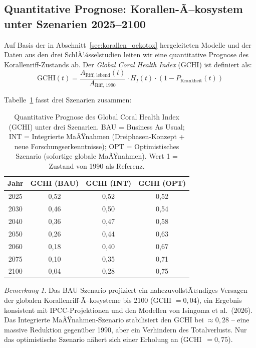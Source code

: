 ﻿\documentclass[12pt,a4paper]{article}
\theoremstyle{definition}
\theoremstyle{remark}
\newtheorem{bemerkung}{Bemerkung}[section]
\begin{document}
\subsection{Quantitative Prognose: Korallen-Ã–kosystem unter Szenarien 2025--2100}
\label{subsec:korallen_prognose}

Auf Basis der in Abschnitt~\ref{sec:korallen_oekotox} hergeleiteten Modelle und der
Daten aus den drei SchlÃ¼sselstudien leiten wir eine quantitative Prognose des
Korallenriff-Zustands ab. Der \textit{Global Coral Health Index} (GCHI) ist
definiert als:
\begin{equation}
  \text{GCHI}(t) = \frac{A_{\text{Riff, lebend}}(t)}{A_{\text{Riff, 1990}}} \cdot
  H_I(t) \cdot (1 - P_{\text{Krankheit}}(t))
  \label{eq:gchi}
\end{equation}

Tabelle~\ref{tab:korallen_prognose} fasst drei Szenarien zusammen:

\begin{table}[H]
  \centering
  \caption{Quantitative Prognose des Global Coral Health Index (GCHI) unter
           drei Szenarien. BAU = Business As Usual; INT = Integrierte
           MaÃŸnahmen (Dreiphasen-Konzept + neue Forschungserkenntnisse);
           OPT = Optimistisches Szenario (sofortige globale MaÃŸnahmen).
           Wert 1 = Zustand von 1990 als Referenz.}
  \label{tab:korallen_prognose}
  \begin{tabular}{cccc}
    \toprule
    Jahr & GCHI (BAU) & GCHI (INT) & GCHI (OPT) \\
    \midrule
    2025 & 0{,}52 & 0{,}52 & 0{,}52 \\
    2030 & 0{,}46 & 0{,}50 & 0{,}54 \\
    2040 & 0{,}36 & 0{,}47 & 0{,}58 \\
    2050 & 0{,}26 & 0{,}44 & 0{,}63 \\
    2060 & 0{,}18 & 0{,}40 & 0{,}67 \\
    2075 & 0{,}10 & 0{,}35 & 0{,}71 \\
    2100 & 0{,}04 & 0{,}28 & 0{,}75 \\
    \bottomrule
  \end{tabular}
\end{table}

\begin{bemerkung}
Das BAU-Szenario projiziert ein nahezuvollstÃ¤ndiges Versagen der globalen
Korallenriff-Ã–kosysteme bis 2100 (GCHI $= 0{,}04$), ein Ergebnis konsistent mit
IPCC-Projektionen und den Modellen von Isingoma et al.\ (2026). Das Integrierte
MaÃŸnahmen-Szenario stabilisiert den GCHI bei ${\approx}0{,}28$ -- eine massive
Reduktion gegen\"uber 1990, aber ein Verhindern des Totalverlusts. Nur das
optimistische Szenario n\"ahert sich einer Erholung an (GCHI~$= 0{,}75$).
\end{bemerkung}
\end{document}
